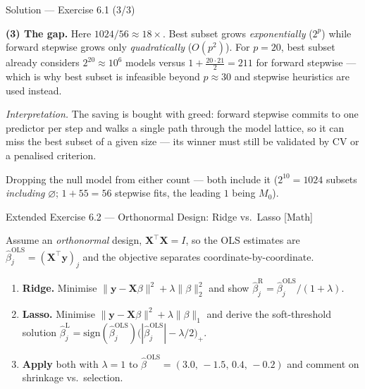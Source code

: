 \documentclass[aspectratio=169,11pt]{beamer}
\begin{document}
\begin{frame}{Solution --- Exercise 6.1 (3/3)}
  \begin{solutionbox}
    \textbf{(3) The gap.}
    Here $1024 / 56 \approx 18\times$. Best subset grows
    \emph{exponentially} ($2^p$) while forward stepwise grows only
    \emph{quadratically} ($O(p^2)$). For $p = 20$, best subset already
    considers $2^{20} \approx 10^6$ models versus
    $1 + \tfrac{20 \cdot 21}{2} = 211$ for forward stepwise --- which is
    why best subset is infeasible beyond $p \approx 30$ and stepwise
    heuristics are used instead.

    \emph{Interpretation.} The saving is bought with greed: forward
    stepwise commits to one predictor per step and walks a single path
    through the model lattice, so it can miss the best subset of a given
    size --- its winner must still be validated by CV or a penalised
    criterion.
  \end{solutionbox}
  \begin{mistake}
    Dropping the null model from either count --- both include it
    ($2^{10} = 1024$ subsets \emph{including} $\varnothing$; $1 + 55 = 56$
    stepwise fits, the leading $1$ being $M_0$).
  \end{mistake}
\end{frame}

\begin{frame}{Extended Exercise 6.2 --- Orthonormal Design: Ridge vs.\ Lasso [Math]}\label{frm:ee62}
  \begin{longexercise}
    Assume an \emph{orthonormal} design, $\mathbf{X}^\top\mathbf{X}=I$,
    so the OLS estimates are $\hat\beta_j^{\mathrm{OLS}}
    =(\mathbf{X}^\top\mathbf{y})_j$ and the objective separates
    coordinate-by-coordinate.
    \begin{enumerate}
      \item \textbf{Ridge.} Minimise
            $\lVert\mathbf{y}-\mathbf{X}\beta\rVert^2+\lambda
            \lVert\beta\rVert_2^2$ and show
            $\hat\beta_j^{\mathrm R}=\hat\beta_j^{\mathrm{OLS}}/(1+\lambda)$.
      \item \textbf{Lasso.} Minimise
            $\lVert\mathbf{y}-\mathbf{X}\beta\rVert^2+\lambda
            \lVert\beta\rVert_1$ and derive the soft-threshold solution
            $\hat\beta_j^{\mathrm L}
            =\mathrm{sign}(\hat\beta_j^{\mathrm{OLS}})
            \bigl(|\hat\beta_j^{\mathrm{OLS}}|-\lambda/2\bigr)_+$.
      \item \textbf{Apply} both with $\lambda=1$ to
            $\hat\beta^{\mathrm{OLS}}=(3.0,\,-1.5,\,0.4,\,-0.2)$ and
            comment on shrinkage vs.\ selection.
    \end{enumerate}
  \end{longexercise}
\end{frame}
\end{document}
